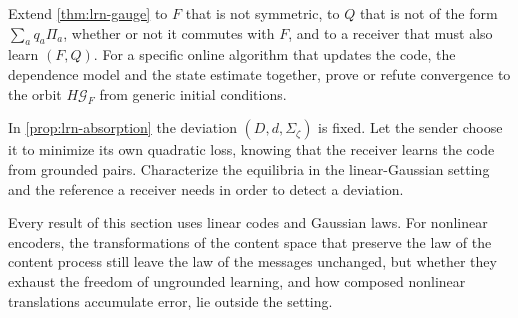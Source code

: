 \begin{openproblem}\label{open:lrn-joint}
Extend \cref{thm:lrn-gauge} to $F$ that is not symmetric, to $Q$ that is not of the form $\sum_aq_a\Pi_a$, whether or not it commutes with $F$, and to a receiver that must also learn $(F,Q)$. For a specific online algorithm that updates the code, the dependence model and the state estimate together, prove or refute convergence to the orbit $H\mathcal G_F$ from generic initial conditions.
\end{openproblem}

\begin{openproblem}\label{open:lrn-strategic}
In \cref{prop:lrn-absorption} the deviation $(D,d,\Sigma_\zeta)$ is fixed. Let the sender choose it to minimize its own quadratic loss, knowing that the receiver learns the code from grounded pairs. Characterize the equilibria in the linear-Gaussian setting and the reference a receiver needs in order to detect a deviation.
\end{openproblem}

\begin{openproblem}\label{open:lrn-nonlinear}
Every result of this section uses linear codes and Gaussian laws. For nonlinear encoders, the transformations of the content space that preserve the law of the content process still leave the law of the messages unchanged, but whether they exhaust the freedom of ungrounded learning, and how composed nonlinear translations accumulate error, lie outside the setting.
\end{openproblem}
